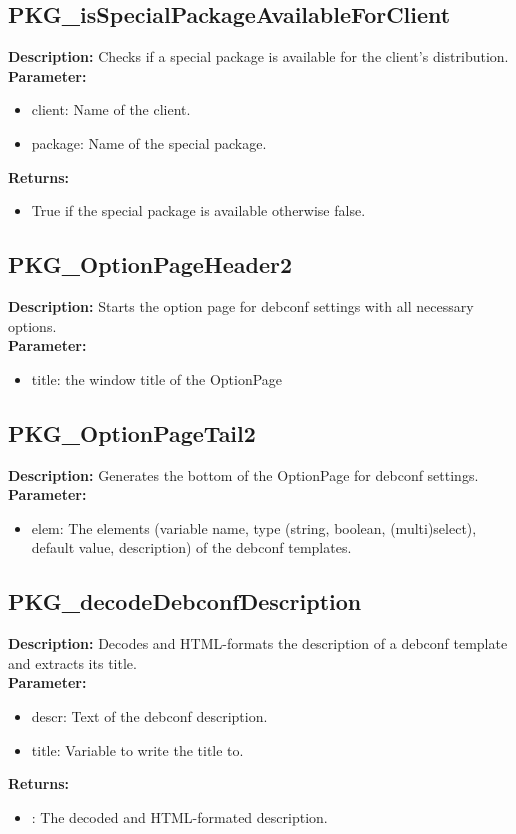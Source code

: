 \subsection{PKG\_isSpecialPackageAvailableForClient}
\textbf{Description:} Checks if a special package is available for the client's distribution.\\
\textbf{Parameter:}
\begin{itemize}
\item client: Name of the client.
\item package: Name of the special package.
\end{itemize}
\textbf{Returns:}
\begin{itemize}
\item True if the special package is available otherwise false.
\end{itemize}

\subsection{PKG\_OptionPageHeader2}
\textbf{Description:} Starts the option page for debconf settings with all necessary options.\\
\textbf{Parameter:}
\begin{itemize}
\item title: the window title of the OptionPage
\end{itemize}

\subsection{PKG\_OptionPageTail2}
\textbf{Description:} Generates the bottom of the OptionPage for debconf settings.\\
\textbf{Parameter:}
\begin{itemize}
\item elem: The elements (variable name, type (string, boolean, (multi)select), default value, description) of the debconf templates.
\end{itemize}

\subsection{PKG\_decodeDebconfDescription}
\textbf{Description:} Decodes and HTML-formats the description of a debconf template and extracts its title.\\
\textbf{Parameter:}
\begin{itemize}
\item descr: Text of the debconf description.
\item title: Variable to write the title to.
\end{itemize}
\textbf{Returns:}
\begin{itemize}
\item : The decoded and HTML-formated description.
\end{itemize}

